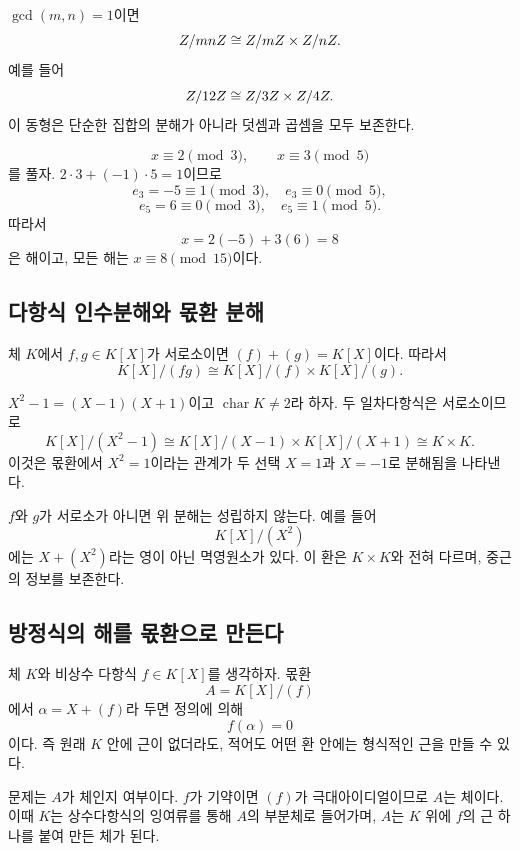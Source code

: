 \begin{example}
$\gcd(m,n)=1$이면
\[
  Z/mnZ\cong Z/mZ\times Z/nZ.
\]
예를 들어
\[
  Z/12Z\cong Z/3Z\times Z/4Z.
\]
이 동형은 단순한 집합의 분해가 아니라 덧셈과 곱셈을 모두 보존한다.
\end{example}

\begin{example}[합동식 풀기]
\[
  x\equiv2\pmod3,\qquad x\equiv3\pmod5
\]
를 풀자. $2\cdot3+(-1)\cdot5=1$이므로
\[
  e_3=-5\equiv1\pmod3,\quad e_3\equiv0\pmod5,
\]
\[
  e_5=6\equiv0\pmod3,\quad e_5\equiv1\pmod5.
\]
따라서
\[
  x=2(-5)+3(6)=8
\]
은 해이고, 모든 해는 $x\equiv8\pmod{15}$이다.
\end{example}

\subsection{다항식 인수분해와 몫환 분해}

체 $K$에서 $f,g\in K[X]$가 서로소이면 $(f)+(g)=K[X]$이다. 따라서
\[
  K[X]/(fg)\cong K[X]/(f)\times K[X]/(g).
\]

\begin{example}
$X^2-1=(X-1)(X+1)$이고 $\operatorname{char}K\ne2$라 하자. 두 일차다항식은 서로소이므로
\[
  K[X]/(X^2-1)\cong K[X]/(X-1)\times K[X]/(X+1)
  \cong K\times K.
\]
이것은 몫환에서 $X^2=1$이라는 관계가 두 선택 $X=1$과 $X=-1$로 분해됨을 나타낸다.
\end{example}

\begin{pitfall}
$f$와 $g$가 서로소가 아니면 위 분해는 성립하지 않는다. 예를 들어
\[
  K[X]/(X^2)
\]
에는 $X+(X^2)$라는 영이 아닌 멱영원소가 있다. 이 환은 $K\times K$와 전혀 다르며, 중근의 정보를 보존한다.
\end{pitfall}

\subsection{방정식의 해를 몫환으로 만든다}

체 $K$와 비상수 다항식 $f\in K[X]$를 생각하자. 몫환
\[
  A=K[X]/(f)
\]
에서 $\alpha=X+(f)$라 두면 정의에 의해
\[
  f(\alpha)=0
\]
이다. 즉 원래 $K$ 안에 근이 없더라도, 적어도 어떤 환 안에는 형식적인 근을 만들 수 있다.

문제는 $A$가 체인지 여부이다. $f$가 기약이면 $(f)$가 극대아이디얼이므로 $A$는 체이다. 이때 $K$는 상수다항식의 잉여류를 통해 $A$의 부분체로 들어가며, $A$는 $K$ 위에 $f$의 근 하나를 붙여 만든 체가 된다.

